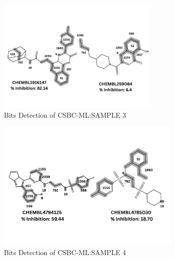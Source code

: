 \begin{figure}[h] %
	\centering
	\includegraphics[width=0.7\textwidth]{82_14_vs_6_4_bits_visualization_bw.png} %
	\caption{Bits Detection of CSBC-ML:SAMPLE 3}
	\vspace{-0.3cm}
	\label{fig:bit_visualization_8264} %
\end{figure}

\begin{figure}[htbp!] %
	\centering
	\includegraphics[width=0.8\textwidth]{3_403_mol_inhibition.png} %
	\caption{Bits Detection of CSBC-ML:SAMPLE 4}
	\vspace{-0.3cm}
	\label{fig:bit_visualization_5918} %
\end{figure}

